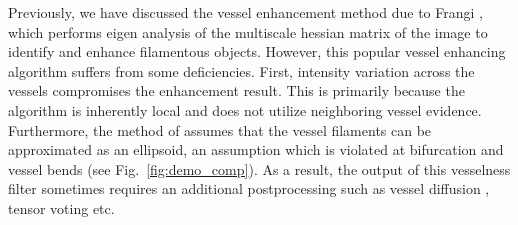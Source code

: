Previously, we have discussed the vessel enhancement method due to Frangi \cite{frangi_vesselness}, which performs eigen analysis of the multiscale hessian matrix of the image to identify and enhance filamentous objects.  However, this popular vessel enhancing algorithm suffers from some deficiencies. First, intensity variation across the vessels compromises the enhancement result. This is primarily because the algorithm is inherently local and does not utilize neighboring vessel evidence. Furthermore, the method of \cite{frangi_vesselness} assumes that the vessel filaments can be approximated as an ellipsoid, an assumption which is violated  at bifurcation and vessel bends (see Fig.~\ref{fig:demo_comp}). As a result, the output of this vesselness filter sometimes requires an additional postprocessing such as vessel diffusion \cite{manniesing2006vessel}, tensor voting \cite{roysam_tensorvoting} etc.

